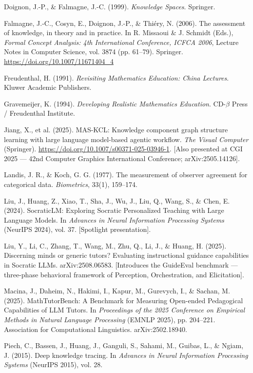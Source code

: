 \documentclass[
]{article}
\begin{document}
Doignon, J.-P., \& Falmagne, J.-C. (1999). \emph{Knowledge Spaces}. Springer.

Falmagne, J.-C., Cosyn, E., Doignon, J.-P., \& Thiéry, N. (2006). The assessment of knowledge, in theory and in practice. In R. Missaoui \& J. Schmidt (Eds.), \emph{Formal Concept Analysis: 4th International Conference, ICFCA 2006}, Lecture Notes in Computer Science, vol. 3874 (pp. 61--79). Springer. \url{https://doi.org/10.1007/11671404_4}

Freudenthal, H. (1991). \emph{Revisiting Mathematics Education: China Lectures}. Kluwer Academic Publishers.

Gravemeijer, K. (1994). \emph{Developing Realistic Mathematics Education}. CD-$\beta$ Press / Freudenthal Institute.

Jiang, X., et al. (2025). MAS-KCL: Knowledge component graph structure learning with large language model-based agentic workflow. \emph{The Visual Computer} (Springer). \url{https://doi.org/10.1007/s00371-025-03946-1}. {[}Also presented at CGI 2025 --- 42nd Computer Graphics International Conference; arXiv:2505.14126{]}.

Landis, J. R., \& Koch, G. G. (1977). The measurement of observer agreement for categorical data. \emph{Biometrics}, 33(1), 159--174.

Liu, J., Huang, Z., Xiao, T., Sha, J., Wu, J., Liu, Q., Wang, S., \& Chen, E. (2024). SocraticLM: Exploring Socratic Personalized Teaching with Large Language Models. In \emph{Advances in Neural Information Processing Systems} (NeurIPS 2024), vol. 37. {[}Spotlight presentation{]}.

Liu, Y., Li, C., Zhang, T., Wang, M., Zhu, Q., Li, J., \& Huang, H. (2025). Discerning minds or generic tutors? Evaluating instructional guidance capabilities in Socratic LLMs. arXiv:2508.06583. {[}Introduces the GuideEval benchmark --- three-phase behavioral framework of Perception, Orchestration, and Elicitation{]}.

Macina, J., Daheim, N., Hakimi, I., Kapur, M., Gurevych, I., \& Sachan, M. (2025). MathTutorBench: A Benchmark for Measuring Open-ended Pedagogical Capabilities of LLM Tutors. In \emph{Proceedings of the 2025 Conference on Empirical Methods in Natural Language Processing} (EMNLP 2025), pp. 204--221. Association for Computational Linguistics. arXiv:2502.18940.

Piech, C., Bassen, J., Huang, J., Ganguli, S., Sahami, M., Guibas, L., \& Ngiam, J. (2015). Deep knowledge tracing. In \emph{Advances in Neural Information Processing Systems} (NeurIPS 2015), vol. 28.
\end{document}
